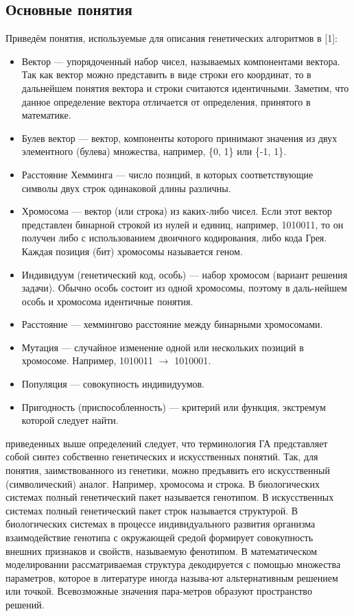 \documentclass[a4paper, oneside, 11pt]{article}
\begin{document}
\subsection{Основные понятия}
Приведём понятия, используемые для описания генетических алгоритмов в [1]:
\begin{itemize}
\item Вектор — упорядоченный набор чисел, называемых компонентами вектора. Так как вектор можно представить в виде строки его координат, то в дальнейшем понятия вектора и строки считаются идентичными. Заметим, что данное определение вектора отличается от определения, принятого в математике.

\item Булев вектор — вектор, компоненты которого принимают значения из двух элементного (булева) множества, например, \{0, 1\} или \{-1, 1\}.

\item Расстояние Хемминга — число позиций, в которых соответствующие символы двух строк одинаковой длины различны.

\item Хромосома — вектор (или строка) из каких-либо чисел. Если этот вектор представлен бинарной строкой из нулей и единиц, например, 1010011, то он получен либо с использованием двоичного кодирования, либо кода Грея. Каждая позиция (бит) хромосомы называется геном.

\item Индивидуум (генетический код, особь) — набор хромосом (вариант решения задачи). Обычно особь состоит из одной хромосомы, поэтому в даль-нейшем особь и хромосома идентичные понятия.

\item Расстояние — хеммингово расстояние между бинарными хромосомами.

\item Мутация — случайное изменение одной или нескольких позиций в хромосоме. Например, 1010011 $\to$ 1010001.

\item Популяция — совокупность индивидуумов.

\item Пригодность (приспособленность) — критерий или функция, экстремум которой следует найти.
\end{itemize}
 приведенных выше определений следует, что терминология ГА представляет собой синтез собственно генетических и искусственных понятий.
Так, для понятия, заимствованного из генетики, можно предъявить его искусственный (символический) аналог. Например, хромосома и строка. В
биологических системах полный генетический пакет
называется генотипом. В искусственных системах полный генетический пакет строк называется структурой. В биологических системах в процессе индивидуального
развития организма взаимодействие генотипа с окружающей средой формирует совокупность внешних признаков и свойств, называемую фенотипом.
В математическом моделировании рассматриваемая структура декодируется
с помощью множества параметров, которое в литературе иногда называ-ют альтернативным решением или точкой. Всевозможные значения пара-метров образуют пространство решений.
\end{document}
